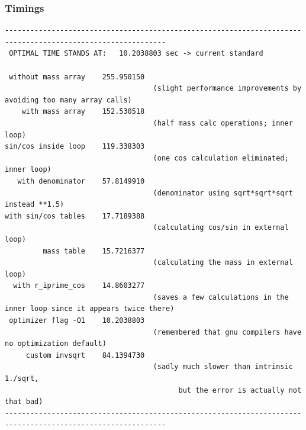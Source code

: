 \documentclass{beamer}
\begin{document}
\begin{frame}[fragile]
  \frametitle{Timings}
  {\tiny
  \begin{verbatim}
------------------------------------------------------------------------------------------------------------
 OPTIMAL TIME STANDS AT:   10.2038803 sec -> current standard

 without mass array    255.950150
                                   (slight performance improvements by avoiding too many array calls)
    with mass array    152.530518
                                   (half mass calc operations; inner loop)
sin/cos inside loop    119.338303
                                   (one cos calculation eliminated; inner loop)
   with denominator    57.8149910
                                   (denominator using sqrt*sqrt*sqrt instead **1.5)
with sin/cos tables    17.7189388
                                   (calculating cos/sin in external loop)
         mass table    15.7216377
                                   (calculating the mass in external loop)
  with r_iprime_cos    14.8603277
                                   (saves a few calculations in the inner loop since it appears twice there)
 optimizer flag -O1    10.2038803
                                   (remembered that gnu compilers have no optimization default)
     custom invsqrt    84.1394730
                                   (sadly much slower than intrinsic 1./sqrt,
                                         but the error is actually not that bad)
------------------------------------------------------------------------------------------------------------
  \end{verbatim}}
\end{frame}
\end{document}
